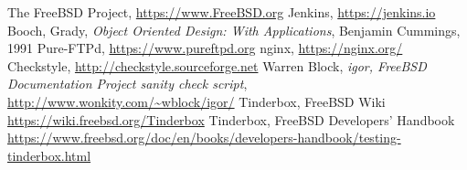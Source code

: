 \documentclass[a4paper,twocolumn,10pt]{article}
\begin{document}
\begin{thebibliography}{999}
 The FreeBSD Project,
\url{https://www.FreeBSD.org}
 Jenkins,
\url{https://jenkins.io}
  Booch, Grady, \textit{ Object Oriented Design: With Applications},
Benjamin Cummings, 1991
 Pure-FTPd,
\url{https://www.pureftpd.org}
 nginx,
\url{https://nginx.org/}
 Checkstyle,
\url{http://checkstyle.sourceforge.net}
 Warren Block, \textit{igor, FreeBSD Documentation Project sanity check script},
\url{http://www.wonkity.com/~wblock/igor/}
 Tinderbox, FreeBSD Wiki
\url{https://wiki.freebsd.org/Tinderbox}
 Tinderbox, FreeBSD Developers' Handbook
\url{https://www.freebsd.org/doc/en/books/developers-handbook/testing-tinderbox.html}
\end{thebibliography}
\end{document}

